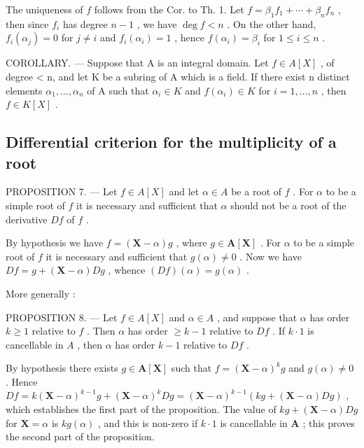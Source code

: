 The uniqueness of \(f\) follows from the Cor. to Th. 1. Let \(f = \beta_{1}f_{1} + \cdots + \beta_{n}f_{n}\) , then since \(f_{i}\) has degree \(n - 1\) , we have \(\deg f < n\) . On the other hand, \(f_{i}(\alpha_{j}) = 0\) for \(j \neq i\) and \(f_{i}(\alpha_{i}) = 1\) , hence \(f(\alpha_{i}) = \beta_{i}\) for \(1 \leqslant i \leqslant n\) .

COROLLARY. --- Suppose that A is an integral domain. Let \(f \in A[X]\) , of degree \textless{} n, and let K be a subring of A which is a field. If there exist n distinct elements \(\alpha_{1}, \ldots, \alpha_{n}\) of A such that \(\alpha_{i} \in K\) and \(f(\alpha_{i}) \in K\) for \(i = 1, \ldots, n\) , then \(f \in K[X]\) .

\subsection{Differential criterion for the multiplicity of a root}

PROPOSITION 7. --- Let \(f \in A[X]\) and let \(\alpha \in A\) be a root of \(f\) . For \(\alpha\) to be a simple root of \(f\) it is necessary and sufficient that \(\alpha\) should not be a root of the derivative \(Df\) of \(f\) .

By hypothesis we have \(f = (\mathbf{X} - \alpha)g\) , where \(g \in \mathbf{A}[\mathbf{X}]\) . For \(\alpha\) to be a simple root of \(f\) it is necessary and sufficient that \(g(\alpha) \neq 0\) . Now we have \(Df = g + (\mathbf{X} - \alpha)Dg\) , whence \((Df)(\alpha) = g(\alpha)\) .

More generally :

PROPOSITION 8. --- Let \(f \in A[X]\) and \(\alpha \in A\) , and suppose that \(\alpha\) has order \(k \geqslant 1\) relative to \(f\) . Then \(\alpha\) has order \(\geqslant k - 1\) relative to \(Df\) . If \(k \cdot 1\) is cancellable in \(A\) , then \(\alpha\) has order \(k - 1\) relative to \(Df\) .

By hypothesis there exists \(g \in \mathbf{A}[\mathbf{X}]\) such that \(f = (\mathbf{X} - \alpha)^k g\) and \(g(\alpha) \neq 0\) . Hence \(Df = k(\mathbf{X} - \alpha)^{k-1}g + (\mathbf{X} - \alpha)^k Dg = (\mathbf{X} - \alpha)^{k-1}(kg + (\mathbf{X} - \alpha)Dg)\) , which establishes the first part of the proposition. The value of \(kg + (\mathbf{X} - \alpha)Dg\) for \(\mathbf{X} = \alpha\) is \(kg(\alpha)\) , and this is non-zero if \(k \cdot 1\) is cancellable in \(\mathbf{A}\) ; this proves the second part of the proposition.


